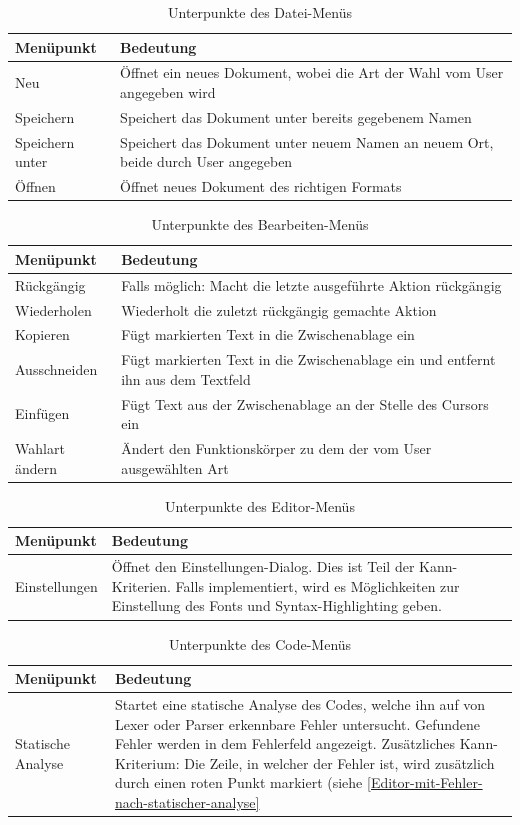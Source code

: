 \documentclass[a4paper]{scrreprt}
\begin{document}
\begin{table}[H]
\begin{tabular}{|p{3cm}|p{12cm}|}
Menüpunkt & Bedeutung \\
\hline
Neu & Öffnet ein neues Dokument, wobei die Art der Wahl vom User angegeben wird \\
Speichern & Speichert das Dokument unter bereits gegebenem Namen \\
Speichern unter & Speichert das Dokument unter neuem Namen an neuem Ort, beide durch User angegeben \\
Öffnen & Öffnet neues Dokument des richtigen Formats
\end{tabular}
\label{Datei-Menüpunkte}
\caption{Unterpunkte des Datei-Menüs}
\end{table}

\begin{table}[H]
\begin{tabular}{|p{3cm}|p{12cm}|}
Menüpunkt & Bedeutung \\
\hline
Rückgängig & Falls möglich: Macht die letzte ausgeführte Aktion rückgängig \\
Wiederholen & Wiederholt die zuletzt rückgängig gemachte Aktion \\
Kopieren & Fügt markierten Text in die Zwischenablage ein \\
Ausschneiden & Fügt markierten Text in die Zwischenablage ein und entfernt ihn aus dem Textfeld \\
Einfügen & Fügt Text aus der Zwischenablage an der Stelle des Cursors ein \\
Wahlart ändern & Ändert den Funktionskörper zu dem der vom User ausgewählten Art
\end{tabular}
\label{Bearbeiten-Menüpunkte}
\caption{Unterpunkte des Bearbeiten-Menüs}
\end{table}

\begin{table}[H]
\begin{tabular}{|p{3cm}|p{12cm}|}
Menüpunkt & Bedeutung \\
\hline
Einstellungen & Öffnet den Einstellungen-Dialog. Dies ist Teil der Kann-Kriterien. Falls implementiert, wird es Möglichkeiten zur Einstellung des Fonts und Syntax-Highlighting geben.
\end{tabular}
\label{Editor-Menüpunkte}
\caption{Unterpunkte des Editor-Menüs}
\end{table}

\begin{table}[H]
\begin{tabular}{|p{3cm}|p{12cm}|}
Menüpunkt & Bedeutung \\
\hline
Statische Analyse & Startet eine statische Analyse des Codes, welche ihn auf von Lexer oder Parser erkennbare Fehler untersucht. Gefundene Fehler werden in dem Fehlerfeld angezeigt. Zusätzliches Kann-Kriterium: Die Zeile, in welcher der Fehler ist, wird zusätzlich durch einen roten Punkt markiert (siehe \ref{Editor-mit-Fehler-nach-statischer-analyse}
\end{tabular}
\label{Editor-Menüpunkte}
\caption{Unterpunkte des Code-Menüs}
\end{table}
\end{document}
